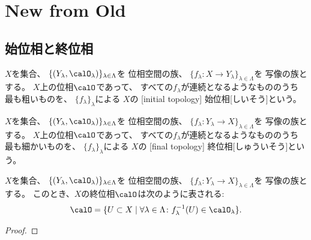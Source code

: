 \documentclass[report]{jlreq}
\begin{document}
\chapter{New from Old}

%
\section{始位相と終位相}

\begin{definition}[始位相]
    $X$を集合、
    $\{ (Y_\lambda, \calO_\lambda) \}_{\lambda \in \Lambda}$を
    位相空間の族、
    $\{ f_\lambda \colon X \to Y_\lambda \}_{\lambda \in \Lambda}$を
    写像の族とする。
    $X$上の位相$\calO$であって、
    すべての$f_\lambda$が連続となるようなもののうち
    最も粗いものを、
    $\{ f_\lambda \}_\lambda$による
    $X$の
    [initial topology]
        {始位相}[しいそう]という。
\end{definition}

\begin{definition}[終位相]
    $X$を集合、
    $\{ (Y_\lambda, \calO_\lambda) \}_{\lambda \in \Lambda}$を
    位相空間の族、
    $\{ f_\lambda \colon Y_\lambda \to X \}_{\lambda \in \Lambda}$を
    写像の族とする。
    $X$上の位相$\calO$であって、
    すべての$f_\lambda$が連続となるようなもののうち
    最も細かいものを、
    $\{ f_\lambda \}_\lambda$による
    $X$の
    [final topology]
        {終位相}[しゅういそう]という。
\end{definition}

\begin{proposition}[終位相の具体的な表示]
    $X$を集合、
    $\{ (Y_\lambda, \calO_\lambda) \}_{\lambda \in \Lambda}$を
    位相空間の族、
    $\{ f_\lambda \colon Y_\lambda \to X \}_{\lambda \in \Lambda}$を
    写像の族とする。
    このとき、$X$の終位相$\calO$は次のように表される:
    \begin{alignat}{1}
        \calO = \{ U \subset X \mid
            \forall \lambda \in \Lambda
            \colon
            f_\lambda^{-1}(U) \in \calO_\lambda \}.
    \end{alignat}
\end{proposition}

\begin{proof}
    \TODO{}
\end{proof}

%
\end{document}
